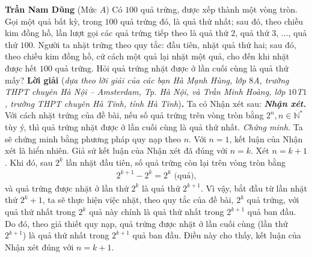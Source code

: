 \begin{multicols}{2}
	\vskip 0.15cm
	\hfill\textbf{\color{thachthuctoanhoc}Trần Nam Dũng}
	\vskip 0.15cm
	{}
	(Mức $A$) Có $100$ quả trứng, được xếp thành một vòng tròn. Gọi một quả bất kỳ, trong $100$ quả trứng đó, là quả thứ nhất; sau đó, theo chiều kim đồng hồ, lần lượt gọi các quả trứng tiếp theo là quả thứ $2$, quả thứ $3$, $\ldots$, quả thứ $100$. Người ta nhặt trứng theo quy tắc: đầu tiên, nhặt quả thứ hai; sau đó, theo chiều kim đồng hồ, cứ cách một quả lại nhặt một quả, cho đến khi nhặt được hết $100$ quả trứng. Hỏi quả trứng nhặt được ở lần cuối cùng là quả thứ mấy?
	\vskip 0.05cm
	\textbf{\color{thachthuctoanhoc}Lời giải} (\textit{dựa theo lời giải của các bạn Hà Mạnh Hùng, lớp $8$A, trường THPT chuyên Hà Nội -- Amsterdam, Tp. Hà Nội, và Trần Minh Hoàng, lớp $10$T$1$, trường THPT chuyên Hà Tĩnh, tỉnh Hà Tĩnh})\textbf{\color{thachthuctoanhoc}.}
	\vskip 0.05cm
	Ta có Nhận xét sau:
	\vskip 0.05cm
	\textbf{\color{thachthuctoanhoc}\textit{Nhận xét.}} Với cách nhặt trứng của đề bài, nếu số quả trứng trên vòng tròn bằng  $2^n,$\linebreak$n \in \mathbb{N^*}$ tùy ý, thì quả trứng nhặt được ở lần cuối cùng là quả thứ nhất.
	\vskip 0.05cm
	\textit{Chứng minh.} Ta sẽ chứng minh bằng phương pháp quy nạp theo $n$.
	\vskip 0.05cm
	Với $n = 1$, kết luận của Nhận xét là hiển nhiên.
	\vskip 0.05cm
	Giả sử kết luận của Nhận xét đã đúng với $n = k$.
	\vskip 0.05cm
	Xét $n = k + 1$.
	\vskip 0.05cm
	Khi đó, sau $2^k$  lần nhặt đầu tiên, số quả trứng còn lại trên vòng tròn bằng
	\begin{align*}
		{2^{k + 1}} - {2^k} = {2^k} \text{ (quả),}
	\end{align*}
	và quả trứng được nhặt ở lần thứ  $2^k$ là quả thứ $2^{k+1}$.
	\vskip 0.05cm 
	Vì vậy, bắt đầu từ lần nhặt thứ $2^k +1$,  ta sẽ thực hiện việc nhặt, theo quy tắc của đề bài, $2^k$  quả trứng, với quả thứ nhất trong $2^k$  quả này chính là quả thứ nhất trong $2^{k+1}$  quả ban đầu. Do đó, theo giả thiết quy nạp, quả trứng được nhặt ở lần cuối cùng (lần thứ  $2^{k+1}$) là quả thứ nhất trong $2^{k+1}$  quả ban đầu. Điều này cho thấy, kết luận của Nhận xét đúng với $n = k + 1$.

\end{multicols}
